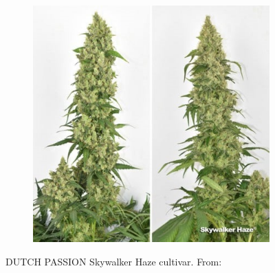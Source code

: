\begin{figure}[htbp]
\begin{subfigure}[t]{.48\textwidth}
        \includegraphics[width=\linewidth]{DUTCH-PASSION_Skywalker-Haze_2}
        \label{fig:cannabis_skywalker-haze_2}
    \end{subfigure}
    \caption[DUTCH PASSION Skywalker Haze]{DUTCH PASSION Skywalker Haze cultivar. From: }
    \label{fig:cannabis_skywalker-haze}
\end{figure}

